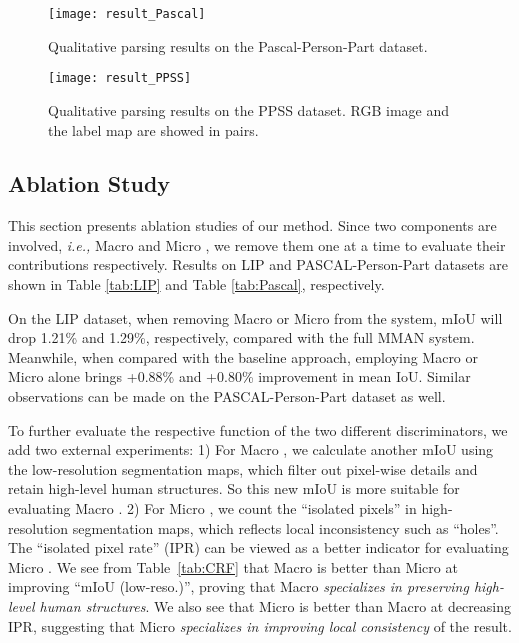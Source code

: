 \documentclass[runningheads]{llncs}
\begin{document}
\begin{figure}[t]
\centering
\texttt{[image: result\_Pascal]}
\caption{Qualitative parsing results on the Pascal-Person-Part dataset.}
\label{fig:result_Pascal}
\vspace{-0.2cm}
\end{figure}

\begin{figure}[!htb]
\centering
\texttt{[image: result\_PPSS]}
\caption{Qualitative parsing results on the PPSS dataset. RGB image and the label map are showed in pairs.}
\label{fig:result_PPSS}
\vspace{-0.2cm}
\end{figure}

\subsection{Ablation Study}\label{Ablation}
This section presents ablation studies of our method. Since two components are involved, \emph{i.e.,} Macro  and Micro , we remove them one at a time to evaluate their  contributions respectively. Results on LIP and PASCAL-Person-Part datasets are shown in Table \ref{tab:LIP} and Table \ref{tab:Pascal}, respectively.

On the LIP dataset, when removing Macro  or Micro  from the system, mIoU will drop 1.21\% and 1.29\%, respectively, compared with the full MMAN system. Meanwhile, when compared with the baseline approach, employing Macro  or Micro  alone brings +0.88\% and +0.80\% improvement in mean IoU. Similar observations can be made on the PASCAL-Person-Part dataset as well. 

To further evaluate the respective function of the two different discriminators, we add two external experiments: 1) For Macro , we calculate another mIoU using the low-resolution segmentation maps, which filter out pixel-wise details and retain high-level human structures. So this new mIoU is more suitable for evaluating Macro . 2) For Micro , we count the ``isolated pixels'' in high-resolution segmentation maps, which reflects local inconsistency such as ``holes''. The ``isolated pixel rate'' (IPR) can be viewed as a better indicator for evaluating Micro . We see from Table~\ref{tab:CRF} that Macro  is better than Micro  at improving ``mIoU (low-reso.)'', proving that Macro  \emph{specializes in preserving high-level human structures}. We also see that Micro  is better than Macro  at decreasing IPR, suggesting that Micro  \emph{specializes in improving local consistency} of the result.
\end{document}
